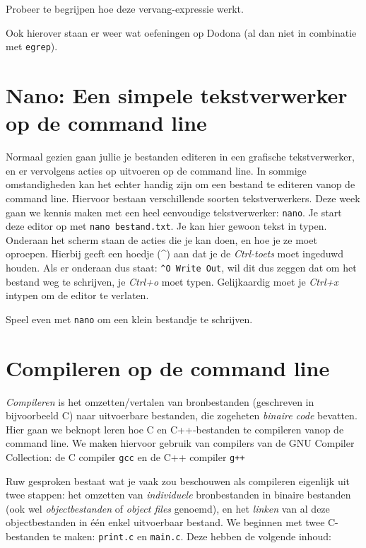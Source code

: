 \documentclass[a4paper,twoside,openany]{memoir}
\begin{document}
Probeer te begrijpen hoe deze vervang-expressie werkt.

Ook hierover staan er weer wat oefeningen op Dodona (al dan niet in combinatie
met \verb!egrep!).

\chapter{Nano: Een simpele tekstverwerker op de command line}

Normaal gezien gaan jullie je bestanden editeren in een grafische
tekstverwerker, en er vervolgens acties op uitvoeren op de command line. In
sommige omstandigheden kan het echter handig zijn om een bestand te editeren
vanop de command line. Hiervoor bestaan verschillende soorten tekstverwerkers.
Deze week gaan we kennis maken met een heel eenvoudige tekstverwerker:
\verb!nano!. Je start deze editor op met \verb!nano bestand.txt!. Je kan hier
gewoon tekst in typen. Onderaan het scherm staan de acties die je kan doen, en
hoe je ze moet oproepen. Hierbij geeft een hoedje (\^{}) aan dat je de
\emph{Ctrl-toets} moet ingeduwd houden. Als er onderaan dus staat: \verb!^O Write Out!,
wil dit dus zeggen dat om het bestand weg te schrijven, je \emph{Ctrl+o} moet
typen. Gelijkaardig moet je \emph{Ctrl+x} intypen om de editor te verlaten.

Speel even met \verb!nano! om een klein bestandje te schrijven.


\chapter{Compileren op de command line}

\emph{Compileren} is het omzetten/vertalen van bronbestanden (geschreven in
bijvoorbeeld C) naar uitvoerbare bestanden, die zogeheten \emph{binaire code}
bevatten. Hier gaan we beknopt leren hoe C en C++-bestanden te compileren vanop
de command line. We maken hiervoor gebruik van compilers van de GNU Compiler
Collection: de C compiler \verb!gcc! en de C++ compiler \verb!g++! 

Ruw gesproken bestaat wat je vaak zou beschouwen als compileren eigenlijk
uit twee stappen: het omzetten van \emph{individuele} bronbestanden
in binaire bestanden (ook wel \emph{objectbestanden} of \emph{object files}
genoemd), en het \emph{linken} van al deze objectbestanden in één enkel
uitvoerbaar bestand. We beginnen met twee C-bestanden te maken: \verb!print.c! en
\verb!main.c!. Deze hebben de volgende inhoud:
\end{document}
